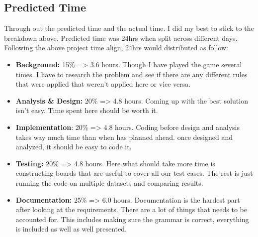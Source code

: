 \subsection*{Predicted Time}
Through out the predicted time and the actual time. I did my best to stick to the breakdown above. Predicted time was 24hrs when split across different days. Following the above project time align, 24hrs would distributed as follow:
\begin{itemize}
	\item \textbf{Background:} 15\% => 3.6 hours. Though I have played the game several times. I have to research the problem and see if there are any different rules that were applied that weren't applied here or vice versa.
	\item \textbf{Analysis \& Design:} 20\% => 4.8 hours. Coming up with the best solution isn't easy. Time spent here should be worth it.
	\item \textbf{Implementation}: 20\% => 4.8 hours. Coding before design and analysis takes way much time than when has planned ahead. once designed and analyzed, it should be easy to code it.
	\item \textbf{Testing:} 20\% => 4.8 hours. Here what should take more time is constructing boards that are useful to cover all our test cases. The rest is just running the code on multiple datasets and comparing results.
	\item \textbf{Documentation:} 25\% => 6.0 hours. Documentation is the hardest part after looking at the requirements. There are a lot of things that needs to be accounted for. This includes making sure the grammar is correct, everything is included as well as well presented.  
\end{itemize}

